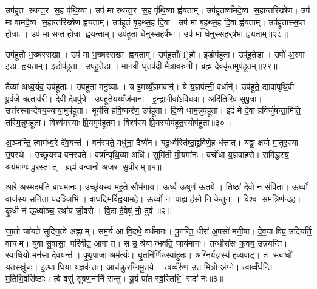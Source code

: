 उप॑हूत रथन्त॒र स॒ह पृ॑थि॒व्या। उप॑ मा रथन्त॒र स॒ह पृ॑थि॒व्या ह्व॑यताम्। उप॑हूतव्वाँमदे॒व्य स॒हान्तरि॑ख्षेण। उप॑ मा वामदे॒व्य स॒हान्तरि॑ख्षेण ह्वयताम्। उप॑हूतं बृ॒हथ्स॒ह दि॒वा। उप॑ मा बृ॒हथ्स॒ह दि॒वा ह्व॑यताम्। उप॑हूतास्स॒प्त होत्राः। उप॑ मा स॒प्त होत्रा ह्वयन्ताम्। उप॑हूता धे॒नुस्स॒हर्ष॑भा। उप॑ मा धे॒नुस्स॒हर्‌ष॑भा ह्वयताम्॥२८॥

उप॑हूतो भ॒ख्षस्सखा। उप॑ मा भ॒ख्षस्सखा ह्वयताम्। उप॑हू॒ताँ(4)हो। इडोप॑हूता। उप॑हू॒तेडा। उपो॑ अ॒स्मा इडा ह्वयताम्। इडोप॑हूता। उप॑हू॒तेडा। मा॒न॒वी घृ॒तप॑दी मैत्रावरु॒णी। ब्रह्म॑ दे॒वकृ॑त॒मुप॑हूतम्॥२९॥

दैव्या॑ अध्व॒र्यव॒ उप॑हूताः। उप॑हूता मनु॒ष्याः। य इ॒मय्यँ॒ज्ञमवान्॑। ये य॒ज्ञप॑त्नीं॒ वर्धान्॑। उप॑हूते॒ द्यावा॑पृथि॒वी। पू॒र्व॒जे ऋ॒ताव॑री। दे॒वी दे॒वपु॑त्रे। उप॑हूते॒यय्यँज॑माना। इ॒न्द्राणीवा॑ऽविध॒वा। अदि॑तिरिव सुपु॒त्रा। उत्त॑रस्यान्देवय॒ज्याया॒मुप॑हूता। भूय॑सि हवि॒ष्कर॑ण॒ उप॑हूता। दि॒व्ये धाम॒न्नुप॑हूता। इ॒दं मे॑ दे॒वा ह॒विर्जु॑षन्ता॒मिति॒ तस्मि॒न्नुप॑हूता। विश्व॑मस्याः प्रि॒यमुप॑हूतम्। विश्व॑स्य प्रि॒यस्योप॑हूत॒स्योप॑हूता॥३०॥



\clearpage
{}
\setcounter{anuvakam}{0}
अ॒ञ्जन्ति॒ त्वाम॑ध्व॒रे दे॑व॒यन्त॑। वन॑स्पते॒ मधु॑ना॒ दैव्ये॑न। यदू॒र्ध्वस्ति॑ष्ठा॒द्द्रवि॑णे॒ह ध॑त्तात्। यद्वा॒ क्षयो॑ मा॒तुर॒स्या उ॒पस्थे। उच्छ्र॑यस्व वनस्पते। वर्ष्म॑न्पृथि॒व्या अधि॑। सुमि॑ती मी॒यमा॑नः। वर्चो॑धा य॒ज्ञवा॑हसे। समि॑द्धस्य॒ श्रय॑माणः पु॒रस्तात्। ब्रह्म॑ वन्वा॒नो अ॒जर सु॒वीरम्॥१॥

आ॒रे अ॒स्मदम॑तिं॒ बाध॑मानः। उच्छ्र॑यस्व मह॒ते सौभ॑गाय। ऊ॒र्ध्व ऊ॒षुण॑ ऊ॒तये। तिष्ठा॑ दे॒वो न स॑वि॒ता। ऊ॒र्ध्वो वाज॑स्य॒ सनि॑ता॒ यद॒ञ्जिभि॑। वा॒घद्भि॑र्वि॒ह्वया॑महे। ऊ॒र्ध्वो न॑ पा॒ह्यह॑सो॒ नि के॒तुना। विश्व॒ सम॒त्रिण॑न्दह। कृ॒धी न॑ ऊ॒र्ध्वाञ्च॒ रथा॑य जी॒वसे। वि॒दा दे॒वेषु॑ नो॒ दुव॑॥२॥

जा॒तो जा॑यते सुदिन॒त्वे अह्नाम्। सम॒र्य आ वि॒दथे॒ वर्ध॑मानः। पु॒नन्ति॒ धीरा॑ अ॒पसो॑ मनी॒षा। दे॒व॒या विप्र॒ उदि॑यर्ति॒ वाचम्। युवा॑ सु॒वासा॒ परि॑वीत॒ आगात्। स उ॒ श्रेयान्भवति॒ जाय॑मानः। तन्धीरा॑सः क॒वय॒ उन्न॑यन्ति। स्वा॒धियो॒ मन॑सा देव॒यन्त॑। पृ॒थु॒पाजा॒ अम॑र्त्यः। घृ॒तनि॑र्णि॒ख्स्वा॑हुतः। अ॒ग्निर्य॒ज्ञस्य॑ हव्य॒वाट्। त स॒बाधो॑ य॒तस्स्रु॑चः। इ॒त्था धि॒या य॒ज्ञव॑न्तः। आच॑क्रुर॒ग्निमू॒तये। त्वव्वँरु॑ण उ॒त मि॒त्रो अ॑ग्ने। त्वाव्वँ॑र्धन्ति म॒तिभि॒र्वसि॑ष्ठाः। त्वे वसु॑ सुषण॒नानि॑ सन्तु। यू॒यं पा॑त स्व॒स्तिभि॒ सदा॑ नः॥३॥\anuvakamend[सु॒वीर॒न्दुव॒ स्वा॑हुतो॒ऽष्टौ च॑]

